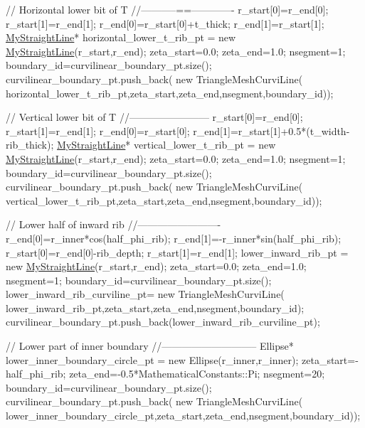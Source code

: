 \begin{DoxyCodeInclude}
 \textcolor{comment}{// Horizontal lower bit of T}
 \textcolor{comment}{//-----------==-------------}
 r\_start[0]=r\_end[0];
 r\_start[1]=r\_end[1];
 r\_end[0]=r\_start[0]+t\_thick;
 r\_end[1]=r\_start[1];
 \hyperlink{classMyStraightLine}{MyStraightLine}* horizontal\_lower\_t\_rib\_pt = \textcolor{keyword}{new} \hyperlink{classMyStraightLine}{MyStraightLine}(r\_start,r\_end);
 zeta\_start=0.0;
 zeta\_end=1.0;
 nsegment=1;
 boundary\_id=curvilinear\_boundary\_pt.size();
 curvilinear\_boundary\_pt.push\_back(
  \textcolor{keyword}{new} TriangleMeshCurviLine(
   horizontal\_lower\_t\_rib\_pt,zeta\_start,zeta\_end,nsegment,boundary\_id));


 \textcolor{comment}{// Vertical lower bit of T}
 \textcolor{comment}{//------------------------}
 r\_start[0]=r\_end[0];
 r\_start[1]=r\_end[1];
 r\_end[0]=r\_start[0];
 r\_end[1]=r\_start[1]+0.5*(t\_width-rib\_thick);
 \hyperlink{classMyStraightLine}{MyStraightLine}* vertical\_lower\_t\_rib\_pt = \textcolor{keyword}{new} \hyperlink{classMyStraightLine}{MyStraightLine}(r\_start,r\_end);
 zeta\_start=0.0;
 zeta\_end=1.0;
 nsegment=1;
 boundary\_id=curvilinear\_boundary\_pt.size();
 curvilinear\_boundary\_pt.push\_back(
  \textcolor{keyword}{new} TriangleMeshCurviLine(
   vertical\_lower\_t\_rib\_pt,zeta\_start,zeta\_end,nsegment,boundary\_id));


 \textcolor{comment}{// Lower half of inward rib}
 \textcolor{comment}{//-------------------------}
 r\_end[0]=r\_inner*cos(half\_phi\_rib);
 r\_end[1]=-r\_inner*sin(half\_phi\_rib);
 r\_start[0]=r\_end[0]-rib\_depth;
 r\_start[1]=r\_end[1];
 lower\_inward\_rib\_pt = \textcolor{keyword}{new} \hyperlink{classMyStraightLine}{MyStraightLine}(r\_start,r\_end);
 zeta\_start=0.0;
 zeta\_end=1.0;
 nsegment=1;
 boundary\_id=curvilinear\_boundary\_pt.size();
 lower\_inward\_rib\_curviline\_pt=
  \textcolor{keyword}{new} TriangleMeshCurviLine(
   lower\_inward\_rib\_pt,zeta\_start,zeta\_end,nsegment,boundary\_id);
 curvilinear\_boundary\_pt.push\_back(lower\_inward\_rib\_curviline\_pt);


 \textcolor{comment}{// Lower part of inner boundary}
 \textcolor{comment}{//-----------------------------}
 Ellipse* lower\_inner\_boundary\_circle\_pt = \textcolor{keyword}{new} Ellipse(r\_inner,r\_inner);
 zeta\_start=-half\_phi\_rib;
 zeta\_end=-0.5*MathematicalConstants::Pi;
 nsegment=20;
 boundary\_id=curvilinear\_boundary\_pt.size();
 curvilinear\_boundary\_pt.push\_back(
  \textcolor{keyword}{new} TriangleMeshCurviLine(
   lower\_inner\_boundary\_circle\_pt,zeta\_start,zeta\_end,nsegment,boundary\_id)); 
 

\end{DoxyCodeInclude}
